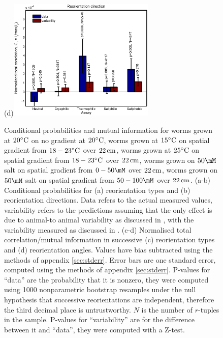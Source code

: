 \documentclass[12pt]{article}
\begin{document}
\begin{figure}
\begin{center}
    (d)\includegraphics[width=7cm]{reoangle_bin.eps}
  \end{center}
  \caption[Conditional probabilities and mutual information (binary).]{Conditional probabilities and mutual information for worms grown at $20^\circ\mathrm{C}$ on no gradient at $20^\circ\mathrm{C}$,
  worms grown at $15^\circ\mathrm{C}$ on spatial gradient from $18-23^\circ\mathrm{C}$ over $22\,\mathrm{cm}$,
  worms grown at $25^\circ\mathrm{C}$ on spatial gradient from $18-23^\circ\mathrm{C}$ over $22\,\mathrm{cm}$,
  worms grown on $50\mM$ salt on spatial gradient from $0-50\mM$ over $22\,\mathrm{cm}$,
  worms grown on $50\mM$ salt on spatial gradient from $50-100\mM$ over $22\,\mathrm{cm}$.
  (a-b) Conditional probabilities for
  (a) reorientation types and
  (b) reorientation directions.
  Data refers to the actual measured values, variability refers to the predictions assuming that the only effect is due to animal-to animal variability as discussed in , with the variability measured as discussed in .
  (c-d) Normalised total correlation/mutual information in successive
  (c) reorientation types and
  (d) reorientation angles.
  Values have bias subtracted using the methods of appendix \ref{sec:stderr}. Error bars are one standard error, computed using the methods of appendix \ref{sec:stderr}.
  P-values for ``data'' are the probability that it is nonzero, they were computed using 1000 nonparametric bootstrap resamples under the null hypothesis that successive reorientations are independent, therefore the third decimal place is untrustworthy.
  $N$ is the number of $r$-tuples in the sample.
  P-values for ``variability'' are for the difference between it and ``data'', they were computed with a Z-test.} \label{fig:binaryresults}
\end{figure}
\end{document}
